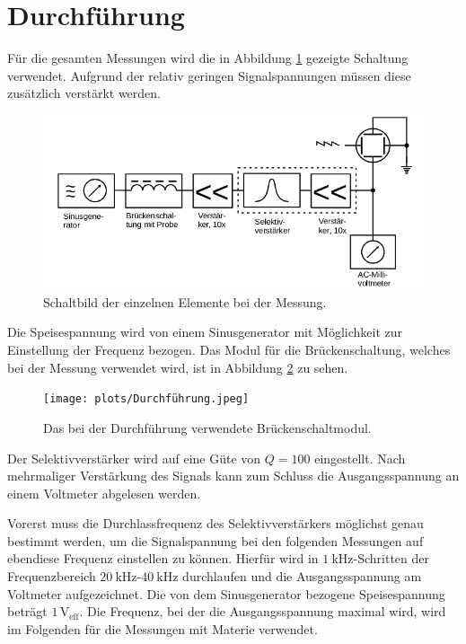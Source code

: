 \section{Durchführung}
\label{sec:Durchführung}

Für die gesamten Messungen wird die in Abbildung \ref{fig:Durchfuehrung} gezeigte Schaltung verwendet. 
Aufgrund der relativ geringen Signalspannungen müssen diese zusätzlich verstärkt werden. 
\begin{figure}
    \centering
    \includegraphics[width=\textwidth]{plots/FinalResult.png}
    \caption{Schaltbild der einzelnen Elemente bei der Messung\cite{Versuchsanleitung}.}
    \label{fig:Durchfuehrung}
\end{figure}
Die Speisespannung wird von einem Sinusgenerator mit Möglichkeit zur Einstellung der Frequenz bezogen. 
Das Modul für die Brückenschaltung, welches bei der Messung verwendet wird, ist in Abbildung \ref{fig:Bruecke} zu sehen.
\begin{figure}
    \centering
    \texttt{[image: plots/Durchführung.jpeg]}
    \caption{Das bei der Durchführung verwendete Brückenschaltmodul.}
    \label{fig:Bruecke}
\end{figure}
Der Selektivverstärker wird auf eine Güte von $Q=100$ eingestellt.
Nach mehrmaliger Verstärkung des Signals kann zum Schluss die Ausgangsspannung an einem Voltmeter abgelesen werden. 

Vorerst muss die Durchlassfrequenz des Selektivverstärkers möglichst genau bestimmt werden, um die Signalspannung 
bei den folgenden Messungen auf ebendiese Frequenz einstellen zu können.
Hierfür wird in $\SI{1}{\kilo\hertz}$-Schritten der Frequenzbereich $\SI{20}{\kilo\hertz}$-$\SI{40}{\kilo\hertz}$ durchlaufen
und die Ausgangsspannung am Voltmeter aufgezeichnet.
Die von dem Sinusgenerator bezogene Speisespannung beträgt $1\,\mathrm{V}_\text{eff}$.
Die Frequenz, bei der die Ausgangsspannung maximal wird, wird im Folgenden für die Messungen mit Materie verwendet. 


